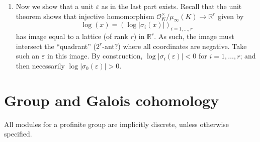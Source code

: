 \documentclass[11pt,answers,addpoints,reqno]{exam}
\theoremstyle{definition}
\theoremstyle{remark}
\theoremstyle{definition}
\theoremstyle{remark}
\theoremstyle{remark}
\theoremstyle{remark}
\newcommand{\RR}{\mathbb{R}}
\newcommand{\mc}{\mathcal}
\begin{document}
\begin{enumerate}
\begin{enumerate}
\item Now we show that a unit $\varepsilon$ as in the last part exists. Recall that the unit theorem shows that injective homomorphism $\mc{O}_K^\times/\mu_{\infty}(K) \to \RR^r$ given by
\[
 \log(x)= (\log|\sigma_i(x)|)_{i=1, \ldots, r}
\]
has image equal to a lattice (of rank $r$) in $\RR^r$. As such, the image must intersect the ``quadrant'' ($2^r$-ant?) where all coordinates are negative. Take such an $\varepsilon$ in this image. By construction, $\log|\sigma_i(\varepsilon)| <0$ for $i=1, \ldots, r$; and then necessarily $\log|\sigma_0(\varepsilon)|>0$.
\end{enumerate}
\end{enumerate}

\section{Group and Galois cohomology}
All modules for a profinite group are implicitly discrete, unless otherwise specified.
\end{document}
